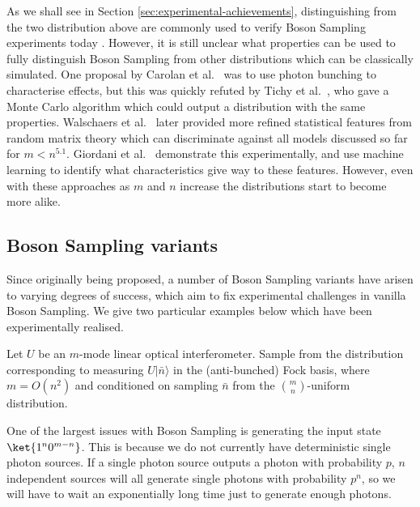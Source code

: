 As we shall see in Section \ref{sec:experimental-achievements}, distinguishing from the two distribution above are commonly used to verify Boson Sampling experiments today \cite{carolan2015, zhong2018, paesani2018, wang2019}. However, it is still unclear what properties can be used to fully distinguish Boson Sampling from other distributions which can be classically simulated. One proposal by Carolan et al.~\cite{carolan2014} was to use photon bunching to characterise effects, but this was quickly refuted by Tichy et al.~\cite{tichy2014}, who gave a Monte Carlo algorithm which could output a distribution with the same properties. Walschaers et al.~\cite{walschaers2016, walschaers2016thesis} later provided more refined statistical features from random matrix theory which can discriminate against all models discussed so far for $m<n^{5.1}$. Giordani et al.~\cite{giordani2018} demonstrate this experimentally, and use machine learning to identify what characteristics give way to these features. However, even with these approaches as $m$ and $n$ increase the distributions start to become more alike.

\subsection{Boson Sampling variants}
\label{ssec:bs-variants}

Since originally being proposed, a number of Boson Sampling variants have arisen to varying degrees of success, which aim to fix experimental challenges in vanilla Boson Sampling. We give two particular examples below which have been experimentally realised.

\begin{problem} Let $U$ be an $m$-mode linear optical interferometer. Sample from the distribution corresponding to measuring $U|\bar{n}\rangle$ in the (anti-bunched) Fock basis, where $m=O(n^2)$ and conditioned on sampling $\bar{n}$ from the $\binom{m}{n}$-uniform distribution.
\end{problem}

One of the largest issues with Boson Sampling is generating the input state $\ket{1^n0^{m-n}}$. This is because we do not currently have deterministic single photon sources. If a single photon source outputs a photon with probability $p$, $n$ independent sources will all generate single photons with probability $p^n$, so we will have to wait an exponentially long time just to generate enough photons.

